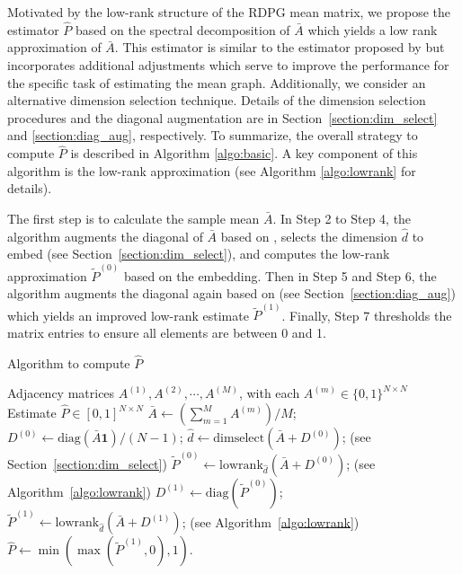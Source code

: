 \documentclass[journal,twoside,web]{ieeecolor}
\begin{document}
Motivated by the low-rank structure of the RDPG mean matrix, we propose the estimator $\hat{P}$ based on the spectral decomposition of $\bar{A}$ which yields a low rank approximation of $\bar{A}$.
% 
This estimator is similar to the estimator proposed by \cite{chatterjee2015matrix} but incorporates additional adjustments which serve to improve the performance for the specific task of estimating the mean graph.
Additionally, we consider an alternative dimension selection technique.
Details of the dimension selection procedures and the diagonal augmentation are in Section~\ref{section:dim_select} and \ref{section:diag_aug}, respectively.
To summarize, the overall strategy to compute $\hat{P}$ is described in Algorithm \ref{algo:basic}.
A key component of this algorithm is the low-rank approximation (see Algorithm \ref{algo:lowrank} for details).

The first step is to calculate the sample mean $\bar{A}$.
In Step 2 to Step 4, the algorithm augments the diagonal of $\bar{A}$ based on \cite{marchette2011vertex}, selects the dimension $\hat{d}$ to embed (see Section~\ref{section:dim_select}), and computes the low-rank approximation $\tilde{P}^{(0)}$ based on the embedding. 
Then in Step 5 and Step 6, the algorithm augments the diagonal again based on \cite{scheinerman2010modeling} (see Section~\ref{section:diag_aug}) which yields an improved low-rank estimate $\tilde{P}^{(1)}$.
Finally, Step 7 thresholds the matrix entries to ensure all elements are between 0 and 1.

\begin{algorithm}
\caption{Algorithm to compute $\hat{P}$}
\label{algo:basic}
\begin{algorithmic}[1]
\REQUIRE Adjacency matrices $A^{(1)}, A^{(2)}, \cdots, A^{(M)}$, with each $A^{(m)} \in \{0,1\}^{N \times N}$
\ENSURE Estimate $\hat{P}\in[0,1]^{N\times N}$
\STATE $\bar{A} \leftarrow \left(\sum\limits_{m = 1}^M A^{(m)}\right)/M$;
\STATE $D^{(0)} \leftarrow \mathrm{diag}(\bar{A} \bm{1})/(N-1)$;
\STATE $\hat{d} \leftarrow \mathrm{dimselect}(\bar{A} + D^{(0)})$; (see Section~\ref{section:dim_select})
\STATE $\tilde{P}^{(0)} \leftarrow \mathrm{lowrank}_{\hat{d}}(\bar{A} + D^{(0)})$; (see Algorithm~\ref{algo:lowrank})
\STATE $D^{(1)} \leftarrow \mathrm{diag}(\tilde{P}^{(0)})$;
\STATE $\tilde{P}^{(1)} \leftarrow \mathrm{lowrank}_{\hat{d}}(\bar{A} + D^{(1)})$; (see Algorithm~\ref{algo:lowrank})
\STATE $\hat{P} \leftarrow \min(\max(\tilde{P}^{(1)}, 0), 1)$.
\end{algorithmic}
\end{algorithm}
\end{document}
